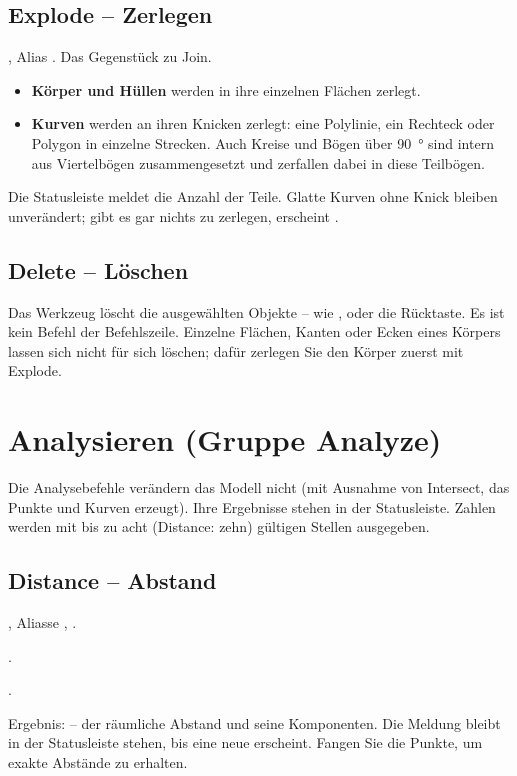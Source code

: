 \subsection{Explode -- Zerlegen}\label{sec:cmd-explode}
, Alias . Das Gegenstück zu Join.
\begin{itemize}
\item \textbf{Körper und Hüllen} werden in ihre einzelnen Flächen zerlegt.
\item \textbf{Kurven} werden an ihren Knicken zerlegt: eine Polylinie, ein Rechteck oder Polygon
  in einzelne Strecken. Auch Kreise und Bögen über \SI{90}{\degree} sind intern aus
  Viertelbögen zusammengesetzt und zerfallen dabei in diese Teilbögen.
\end{itemize}
Die Statusleiste meldet die Anzahl der Teile. Glatte Kurven ohne Knick bleiben unverändert;
gibt es gar nichts zu zerlegen, erscheint .

\subsection{Delete -- Löschen}\label{sec:cmd-delete}
Das Werkzeug  löscht die ausgewählten Objekte -- wie ,
 oder die Rücktaste. Es ist kein Befehl der Befehlszeile. Einzelne Flächen, Kanten
oder Ecken eines Körpers lassen sich nicht für sich löschen; dafür zerlegen Sie den Körper
zuerst mit Explode.

\section{Analysieren (Gruppe Analyze)}\label{sec:gruppe-analyze}

Die Analysebefehle verändern das Modell nicht (mit Ausnahme von Intersect, das Punkte und
Kurven erzeugt). Ihre Ergebnisse stehen in der Statusleiste. Zahlen werden mit bis zu acht
(Distance: zehn) gültigen Stellen ausgegeben.

\subsection{Distance -- Abstand}\label{sec:cmd-distance}
, Aliasse , .
\begin{schritte}
\item {}.
\item {}.
\end{schritte}
Ergebnis:  -- der räumliche Abstand und seine
Komponenten. Die Meldung bleibt in der Statusleiste stehen, bis eine neue erscheint. Fangen Sie
die Punkte, um exakte Abstände zu erhalten.

